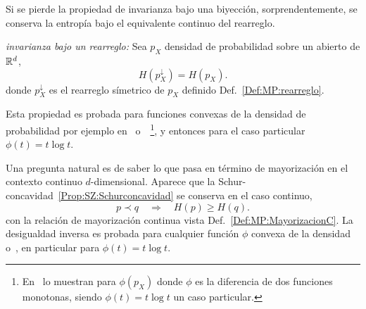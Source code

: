 Si se pierde la propiedad de invarianza bajo una biyecci\'on, sorprendentemente,
se conserva la entrop\'ia bajo el equivalente continuo del rearreglo.

\begin{propiedadesC}\setcounter{enumi}{\value{PropPermutacion}}
\item\label{Prop:SZ:permutacionC} {\it invarianza  bajo un rearreglo:} Sea $p_X$
  densidad de probabilidad sobre un abierto de $\mathbb{R}^d$,
  \[
  H\left( p_X^\downarrow \right) = H(p_X).
  \]
  donde  $p_X^\downarrow$   es  el  rearreglo  s\'imetrico   de  $p_X$  definido
  Def.~\ref{Def:MP:rearreglo}.
\end{propiedadesC}
%
\noindent Esta  propiedad es probada para  funciones convexas de  la densidad de
probabilidad              por             ejemplo             en~\cite{LieLos01}
o~\cite[Lema~7.2]{WanMad04}~\footnote{En~\cite[Sec.~3.3]{LieLos01}  lo  muestran
  para $\phi(p_X)$  donde $\phi$  es la diferencia  de dos  funciones monotonas,
  siendo $\phi(t)  = t  \log t$ un  caso particular.},  y entonces para  el caso
particular $\phi(t) = t \log t$.

Una pregunta natural  es de saber lo que pasa en  t\'ermino de mayorizaci\'on en
el      contexto     continuo      $d$-dimensional.      Aparece      que     la
Schur-concavidad~\ref{Prop:SZ:Schurconcavidad} se conserva  en el caso continuo,
\ie
%
\[
p \prec  q  \quad \Rightarrow  \quad H(p)  \ge H(q).
\]
%
con      la      relaci\'on      de      mayorizaci\'on      continua      vista
Def.~\ref{Def:MP:MayorizacionC}.
La desigualdad inversa es probada  para cualquier funci\'on $\phi$ convexa de la
densidad~\cite{Cho74} o~\cite[Prop.~7.3]{WanMad04},  en particular para $\phi(t)
= t \log t$.

